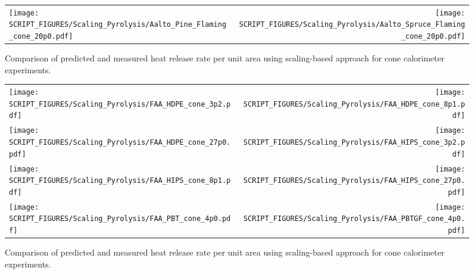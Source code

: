 \begin{figure}[p]
\begin{tabular*}{\textwidth}{l@{\extracolsep{\fill}}r}
\texttt{[image: SCRIPT\_FIGURES/Scaling\_Pyrolysis/Aalto\_Pine\_Flaming\_cone\_20p0.pdf]} &
\texttt{[image: SCRIPT\_FIGURES/Scaling\_Pyrolysis/Aalto\_Spruce\_Flaming\_cone\_20p0.pdf]} \\
\end{tabular*}
\caption[HRRPUA of Aalto Woods using scaling model ]
{Comparison of predicted and measured heat release rate per unit area using scaling-based approach for cone calorimeter experiments.}
\label{Aalto_Woods_HRR_Wood-Based}
\end{figure}

\begin{figure}[p]
\begin{tabular*}{\textwidth}{l@{\extracolsep{\fill}}r}
\texttt{[image: SCRIPT\_FIGURES/Scaling\_Pyrolysis/FAA\_HDPE\_cone\_3p2.pdf]} &
\texttt{[image: SCRIPT\_FIGURES/Scaling\_Pyrolysis/FAA\_HDPE\_cone\_8p1.pdf]} \\
\texttt{[image: SCRIPT\_FIGURES/Scaling\_Pyrolysis/FAA\_HDPE\_cone\_27p0.pdf]} &
\texttt{[image: SCRIPT\_FIGURES/Scaling\_Pyrolysis/FAA\_HIPS\_cone\_3p2.pdf]} \\
\texttt{[image: SCRIPT\_FIGURES/Scaling\_Pyrolysis/FAA\_HIPS\_cone\_8p1.pdf]} &
\texttt{[image: SCRIPT\_FIGURES/Scaling\_Pyrolysis/FAA\_HIPS\_cone\_27p0.pdf]} \\
\texttt{[image: SCRIPT\_FIGURES/Scaling\_Pyrolysis/FAA\_PBT\_cone\_4p0.pdf]} &
\texttt{[image: SCRIPT\_FIGURES/Scaling\_Pyrolysis/FAA\_PBTGF\_cone\_4p0.pdf]} \\
\end{tabular*}
\caption[HRRPUA of FAA Polymers using scaling model ]
{Comparison of predicted and measured heat release rate per unit area using scaling-based approach for cone calorimeter experiments.}
\label{FAA_Polymers_HRR_Polymers}
\end{figure}

